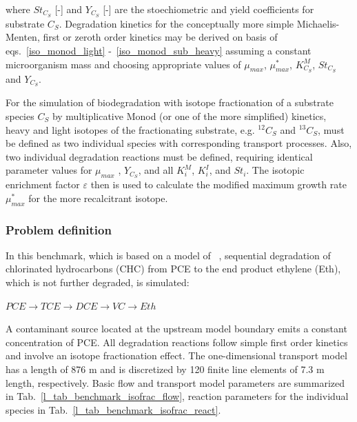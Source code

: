 where $St_{C_S}$ [-] and $Y_{C_S}$ [-] are the stoechiometric and yield coefficients for substrate $C_S$. Degradation kinetics for the conceptually more simple Michaelis-Menten, first or zeroth order kinetics may be derived on basis of eqs.~\ref{iso_monod_light} -~\ref{iso_monod_sub_heavy} assuming a constant microorganism mass and choosing appropriate values of $\mu_{max}$, $\mu_{max}^{\ast}$, $K^M_{C_S}$, $St_{C_S}$ and $Y_{C_S}$.

For the simulation of biodegradation with isotope fractionation of a substrate species $C_S$ by multiplicative Monod (or one of the more simplified) kinetics, heavy and light isotopes of the fractionating substrate, e.g.  $^{12}C_S$ and $^{13}C_S$, must be defined as two individual species with corresponding transport processes. Also, two individual degradation reactions must be defined, requiring identical parameter values for  $\mu_{max}$ , $Y_{C_S}$, and all $K^M_i$, $K^I_i$, and $St_i$. The isotopic enrichment factor $\varepsilon$ then is used to calculate the modified maximum growth rate $\mu_{max}^{\ast}$ for the more recalcitrant isotope.

\subsubsection*{Problem definition}

In this benchmark, which is based on a model of ~\cite{VanBr:05}, sequential degradation of chlorinated hydrocarbons (CHC) from PCE to the end product ethylene (Eth), which is not further degraded, is simulated:

$PCE \rightarrow TCE \rightarrow DCE \rightarrow VC \rightarrow Eth $

A contaminant source located at the upstream model boundary emits a constant concentration of PCE. All degradation reactions follow simple first order kinetics and involve an isotope fractionation effect. The one-dimensional transport model has a length of 876 m and is discretized by 120 finite line elements of 7.3 m length, respectively. Basic flow and transport model parameters are summarized in Tab.~\ref{l_tab_benchmark_isofrac_flow}, reaction parameters for the individual species in Tab.~\ref{l_tab_benchmark_isofrac_react}.

